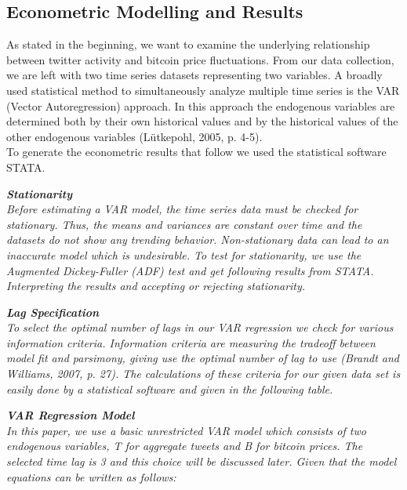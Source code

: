 \documentclass[a4paper,american,12pt]{article}
\begin{document}
\begin{spacing}{1.2}
		\clearpage
		
		\section{Econometric Modelling and Results}
		\textnormal {As stated in the beginning, we want to examine the underlying relationship between twitter activity and bitcoin price fluctuations. From our data collection, we are left with two time series datasets representing two variables. A broadly used statistical method to simultaneously analyze multiple time series is the VAR (Vector Autoregression) approach. In this approach the endogenous variables are determined both by their own historical values and by the historical values of the other endogenous variables (Lütkepohl, 2005, p. 4-5).\\
To generate the econometric results that follow we used the statistical software STATA.}

		\itshape\textbf {Stationarity}\\
		\textnormal {Before estimating a VAR model, the time series data must be checked for stationary. Thus, the means and variances are constant over time and the datasets do not show any trending behavior. Non-stationary data can lead to an inaccurate model which is undesirable. To test for stationarity, we use the Augmented Dickey-Fuller (ADF) test and get following results from STATA.\\
Interpreting the results and accepting or rejecting stationarity.}

		\itshape\textbf {Lag Specification}\\
		\textnormal {To select the optimal number of lags in our VAR regression we check for various information criteria. Information criteria are measuring the tradeoff between model fit and parsimony, giving use the optimal number of lag to use (Brandt and Williams, 2007, p. 27). The calculations of these criteria for our given data set is easily done by a statistical software and given in the following table.\\}
		
		\itshape\textbf {VAR Regression Model}\\
		\textnormal {In this paper, we use a basic unrestricted VAR model which consists of two endogenous variables, T for aggregate tweets and B for bitcoin prices. The selected time lag is 3 and this choice will be discussed later. Given that the model equations can be written as follows:\\}
		

\end{spacing}
\end{document}
